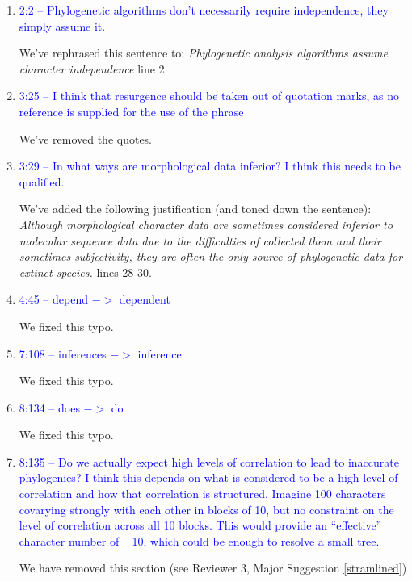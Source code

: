 \documentclass[12pt,letterpaper]{article}
\begin{document}
\begin{enumerate}

\item{\textcolor{blue}{2:2 – Phylogenetic algorithms don't necessarily require independence, they simply assume it.}}
\label{abstract}

We've rephrased this sentence to:
\textit{Phylogenetic analysis algorithms assume character independence} line 2.

\item{\textcolor{blue}{3:25 – I think that resurgence should be taken out of quotation marks, as no reference is supplied for the use of the phrase}}

We've removed the quotes.

\item{\textcolor{blue}{3:29 – In what ways are morphological data inferior? I think this needs to be qualified.}}

We've added the following justification (and toned down the sentence):
\textit{Although morphological character data are sometimes considered inferior to molecular sequence data due to the difficulties of collected them and their sometimes subjectivity, they are often the only source of phylogenetic data for extinct species.} lines 28-30.

\item{\textcolor{blue}{4:45 – depend $->$ dependent}}

We fixed this typo.

\item{\textcolor{blue}{7:108 – inferences $->$ inference}}

We fixed this typo.

\item{\textcolor{blue}{8:134 – does $->$ do}}

We fixed this typo.

\item{\textcolor{blue}{8:135 – Do we actually expect high levels of correlation to lead to inaccurate phylogenies? I think this depends on what is considered to be a high level of correlation and how that correlation is structured. Imagine 100 characters covarying strongly with each other in blocks of 10, but no constraint on the level of correlation across all 10 blocks. This would provide an ``effective'' character number of ~ 10, which could be enough to resolve a small tree.}}

We have removed this section (see Reviewer 3, Major Suggestion \ref{stramlined})


\end{enumerate}
\end{document}
